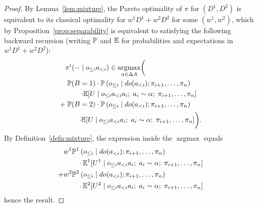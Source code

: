 \documentclass{article}
\newcommand{\hist}[1]{o_{\le #1}a_{<#1}}
\newcommand{\dohist}[1]{o_{\le #1} \mid do(a_{<#1})}
\newcommand{\bool}{B}
\newcommand{\lem}[1]{Lemma~\ref{lem:#1}}
\newcommand{\defn}[1]{Definition~\ref{defn:#1}}
\newcommand{\prop}[1]{Proposition~\ref{prop:#1}}
\DeclareMathOperator*{\argmax}{argmax}
\begin{document}
\begin{proof}
By \lem{mixture}, the Pareto optimality of $\pi$ for $(D^1,D^2)$ is equivalent to its classical optimality for
$w^1D^1 + w^2D^2$ for some $(w^1,w^2)$, which by \prop{separability} is equivalent to satisfying the following backward recursion (writing $\mathbb{P}$ and $\mathbb{E}$ for probabilities and expectations in $w^1D^1 + w^2D^2$):
\begin{align*}
&\pi^i(-\mid\hist{i}) \in \argmax_{\alpha\in\Delta A} \biggl(\vphantom{\left(\left(\right)\right)}\biggr.\\
& \left.\PP(\bool =1)\cdot \PP\left(\dohist{i}; \pi_{i+1},\ldots,\pi_n\right)\right. \\
 & \quad \quad \left.\cdot \EE[U \mid \hist{i} a_i ;\; a_i\sim \alpha;\; \pi_{i+1},\ldots,\pi_n]\right.\\
+ & \left.\PP(\bool =2)\cdot \PP\left(\dohist{i}; \pi_{i+1},\ldots,\pi_n\right)\right. \\
 & \quad \quad \biggl.\cdot \EE[U \mid \hist{i} a_i;\; a_i\sim \alpha;\; \pi_{i+1},\ldots,\pi_n] \biggr).
\end{align*}
By \defn{mixture}, the expression inside the $\argmax$ equals 
\begin{align*}
& w^1 \PP^1\left(\dohist{i}; \pi_{i+1},\ldots,\pi_n\right) \\
& \quad \quad \cdot \EE^1[U^1 \mid \hist{i} a_i ;\; a_i\sim \alpha;\; \pi_{i+1},\ldots,\pi_n]\\
+ & w^2 \PP^2\left(\dohist{i}; \pi_{i+1},\ldots,\pi_n\right) \\
& \quad \quad \cdot \EE^2[U^2 \mid \hist{i} a_i;\; a_i\sim \alpha;\; \pi_{i+1},\ldots,\pi_n]
\end{align*}
hence the result.
\end{proof}
\end{document}
